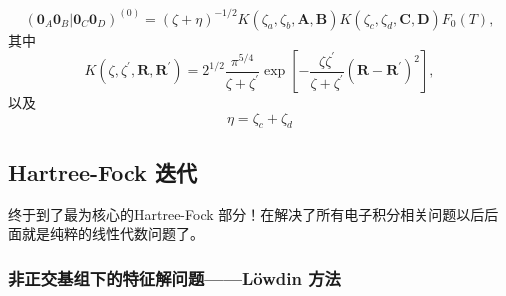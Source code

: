 \documentclass[12pt,a4paper,openany,twoside]{article}
\numberwithin{equation}{section}
\begin{document}
                \begin{equation}
                    (\boldsymbol{0}_A\boldsymbol{0}_B|\boldsymbol{0}_C\boldsymbol{0}_D)^{(0)}=(\zeta+\eta)^{-1 / 2} K\left(\zeta_{a}, \zeta_{b}, \mathbf{A}, \mathbf{B}\right) K\left(\zeta_{c}, \zeta_{d}, \mathbf{C}, \mathbf{D}\right) F_{0}(T),
                \end{equation}
                其中
                \begin{equation}
                    K\left(\zeta, \zeta^{\prime}, \mathbf{R}, \mathbf{R}^{\prime}\right)=2^{1 / 2} \frac{\pi^{5 / 4}}{\zeta+\zeta^{\prime}} \exp \left[-\frac{\zeta \zeta^{\prime}}{\zeta+\zeta^{\prime}}\left(\mathbf{R}-\mathbf{R}^{\prime}\right)^{2}\right],
                \end{equation}
                以及
                \begin{equation}
                    \eta = \zeta_c + \zeta_d
                \end{equation}


            \subsection{Hartree-Fock 迭代}
            终于到了最为核心的Hartree-Fock 部分！在解决了所有电子积分相关问题以后后面就是纯粹的线性代数问题了。
                \subsubsection{非正交基组下的特征解问题——L\"owdin 方法}
\end{document}
